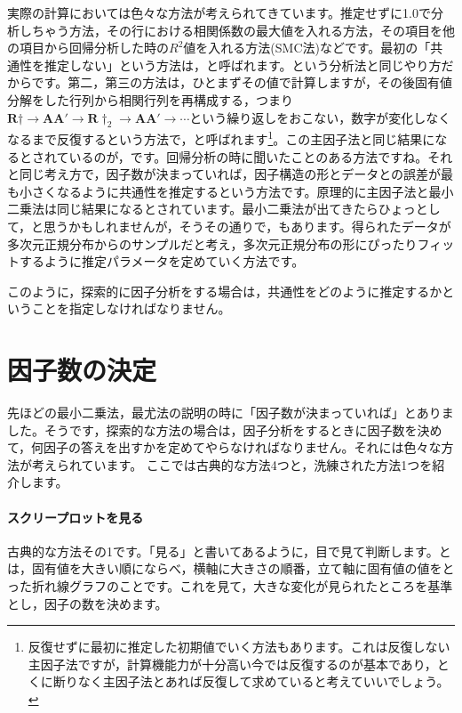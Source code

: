 \documentclass{ltjsbook}
\begin{document}
実際の計算においては色々な方法が考えられてきています。推定せずに1.0で分析しちゃう方法，その行における相関係数の最大値を入れる方法，その項目を他の項目から回帰分析した時の$R^2$値を入れる方法(SMC法)などです。最初の「共通性を推定しない」という方法は，と呼ばれます。という分析法と同じやり方だからです。第二，第三の方法は，ひとまずその値で計算しますが，その後固有値分解をした行列から相関行列を再構成する，つまり$\bm{R}\dagger \to \bm{AA'} \to \bm{R}\dagger_2 \to \bm{AA'} \to \cdots $という繰り返しをおこない，数字が変化しなくなるまで反復するという方法で，と呼ばれます\footnote{反復せずに最初に推定した初期値でいく方法もあります。これは反復しない主因子法ですが，計算機能力が十分高い今では反復するのが基本であり，とくに断りなく主因子法とあれば反復して求めていると考えていいでしょう。}。この主因子法と同じ結果になるとされているのが，です。回帰分析の時に聞いたことのある方法ですね。それと同じ考え方で，因子数が決まっていれば，因子構造の形とデータとの誤差が最も小さくなるように共通性を推定するという方法です。原理的に主因子法と最小二乗法は同じ結果になるとされています。最小二乗法が出てきたらひょっとして，と思うかもしれませんが，そうその通りで，もあります。得られたデータが多次元正規分布からのサンプルだと考え，多次元正規分布の形にぴったりフィットするように推定パラメータを定めていく方法です。

このように，探索的に因子分析をする場合は，共通性をどのように推定するかということを指定しなければなりません。

\section{因子数の決定}
先ほどの最小二乗法，最尤法の説明の時に「因子数が決まっていれば」とありました。そうです，探索的な方法の場合は，因子分析をするときに因子数を決めて，何因子の答えを出すかを定めてやらなければなりません。それには色々な方法が考えられています。
ここでは古典的な方法4つと，洗練された方法1つを紹介します。
\paragraph{スクリープロットを見る}古典的な方法その1です。「見る」と書いてあるように，目で見て判断します。とは，固有値を大きい順にならべ，横軸に大きさの順番，立て軸に固有値の値をとった折れ線グラフのことです。これを見て，大きな変化が見られたところを基準とし，因子の数を決めます。
\end{document}

